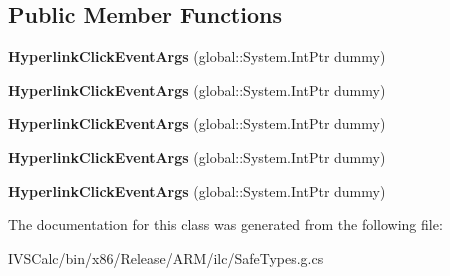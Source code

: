 \subsection*{Public Member Functions}
\begin{DoxyCompactItemize}
\item 
\mbox{\label{class_windows_1_1_u_i_1_1_xaml_1_1_documents_1_1_hyperlink_click_event_args_a4d787452500f7057423a7b0dbda15213}} 
{\bfseries Hyperlink\+Click\+Event\+Args} (global\+::\+System.\+Int\+Ptr dummy)
\item 
\mbox{\label{class_windows_1_1_u_i_1_1_xaml_1_1_documents_1_1_hyperlink_click_event_args_a4d787452500f7057423a7b0dbda15213}} 
{\bfseries Hyperlink\+Click\+Event\+Args} (global\+::\+System.\+Int\+Ptr dummy)
\item 
\mbox{\label{class_windows_1_1_u_i_1_1_xaml_1_1_documents_1_1_hyperlink_click_event_args_a4d787452500f7057423a7b0dbda15213}} 
{\bfseries Hyperlink\+Click\+Event\+Args} (global\+::\+System.\+Int\+Ptr dummy)
\item 
\mbox{\label{class_windows_1_1_u_i_1_1_xaml_1_1_documents_1_1_hyperlink_click_event_args_a4d787452500f7057423a7b0dbda15213}} 
{\bfseries Hyperlink\+Click\+Event\+Args} (global\+::\+System.\+Int\+Ptr dummy)
\item 
\mbox{\label{class_windows_1_1_u_i_1_1_xaml_1_1_documents_1_1_hyperlink_click_event_args_a4d787452500f7057423a7b0dbda15213}} 
{\bfseries Hyperlink\+Click\+Event\+Args} (global\+::\+System.\+Int\+Ptr dummy)
\end{DoxyCompactItemize}


The documentation for this class was generated from the following file\+:\begin{DoxyCompactItemize}
\item 
I\+V\+S\+Calc/bin/x86/\+Release/\+A\+R\+M/ilc/Safe\+Types.\+g.\+cs\end{DoxyCompactItemize}
